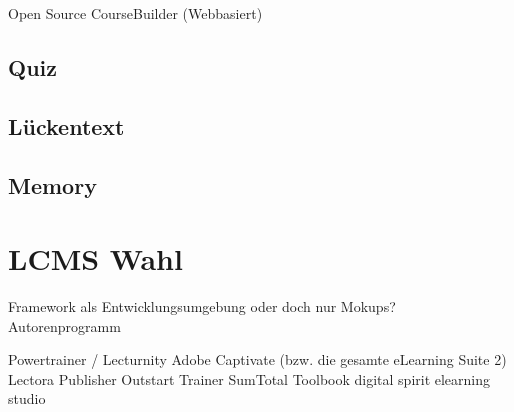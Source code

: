 \documentclass[a4paper, 12pt, twoside, BCOR=20mm, DIV=calc, abstracton, parskip=half*, toc=bibliography, toc=listof, headsepline, footsepline, headings=small, numbers=enddot]{scrreprt}
\begin{document}
Open Source
CourseBuilder (Webbasiert) 

\subsection{Quiz}
\subsection{Lückentext}
\subsection{Memory}

%	


\section{\ac{LCMS} Wahl}
Framework als Entwicklungsumgebung oder doch nur Mokups? 
Autorenprogramm

Powertrainer / Lecturnity 
Adobe Captivate (bzw. die gesamte eLearning Suite 2) 
Lectora Publisher 
Outstart Trainer 
SumTotal Toolbook 
digital spirit elearning studio  
\end{document}

